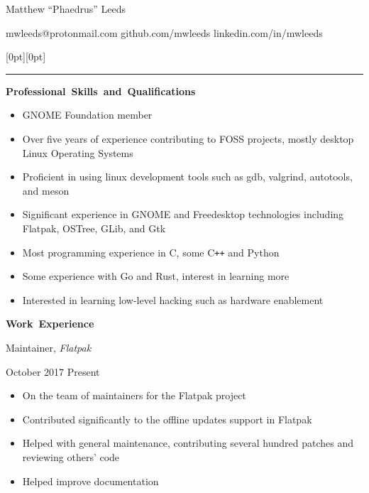 \documentclass[11pt]{article}
\begin{document}
\centerline{\huge Matthew “Phaedrus” Leeds}
\vspace{0.4em}
\centerline{\normalsize mwleeds@protonmail.com \space \textbar \space github.com/mwleeds \space \textbar \space linkedin.com/in/mwleeds}

\noindent \begin{minipage}[t]{\textwidth}
\raisebox{9pt}[0pt][0pt]{\rule{\textwidth}{0.2mm}\hspace{-\textwidth}}
\end{minipage}

\vspace{0.8em}
\hbox{\large \textbf{Professional Skills and Qualifications}}

\begin{itemize}
  \item GNOME Foundation member
  \item Over five years of experience contributing to FOSS projects, mostly desktop Linux Operating Systems
  \item Proficient in using linux development tools such as gdb, valgrind, autotools, and meson
  \item Significant experience in GNOME and Freedesktop technologies including Flatpak, OSTree, GLib, and Gtk
  \item Most programming experience in C, some C\texttt{++} and Python
  \item Some experience with Go and Rust, interest in learning more
  \item Interested in learning low-level hacking such as hardware enablement
\end{itemize}

\vspace{0.8em}
\hbox{\large \textbf{Work Experience}}

\begin{minipage}[t]{0.65\textwidth}
\flushleft
Maintainer, \textit{Flatpak}\\
\end{minipage}
\begin{minipage}[t]{0.30\textwidth}
\flushright
October 2017 \space \textemdash \space Present\\
\end{minipage}

\begin{itemize}
  \item On the team of maintainers for the Flatpak project
  \item Contributed significantly to the offline updates support in Flatpak
  \item Helped with general maintenance, contributing several hundred patches and reviewing others' code
  \item Helped improve documentation
\end{itemize}
\end{document}
